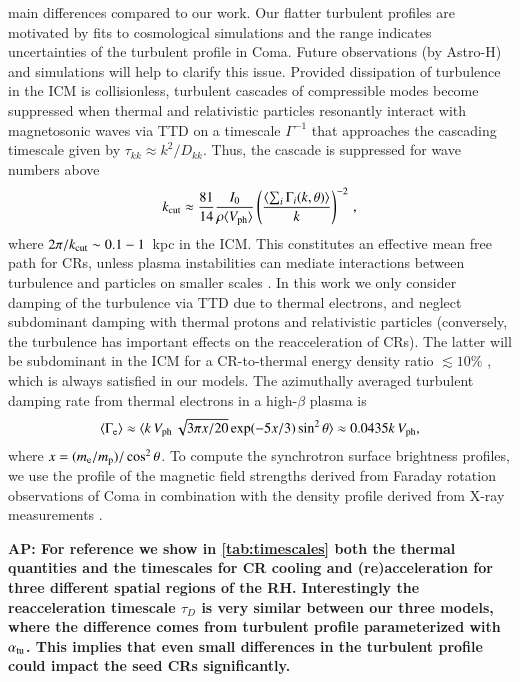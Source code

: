 \documentclass[useAMS,usenatbib]{mn2e}
\newcommand{\Vph}{V_\mathrm{ph}}
\def\AP#1{{\bf  AP: #1}}
\begin{document}
main differences compared to our work. Our flatter turbulent profiles
are motivated by fits to cosmological simulations
\citep{2009ApJ...705.1129L,2010ApJ...725.1452S,2011A&A...529A..17V,2012ApJ...758...74B}
and the range indicates uncertainties of the turbulent profile in
Coma. Future observations (by Astro-H) and simulations will help to
clarify this issue. Provided dissipation of turbulence in the ICM is
collisionless, turbulent cascades of compressible modes become
suppressed when thermal and relativistic particles resonantly interact
with magnetosonic waves via TTD on a timescale $\Gamma^{-1}$ that
approaches the cascading timescale given by $\tau_{kk} \approx
k^2/D_{kk}$. Thus, the cascade is suppressed for wave numbers above
\begin{equation}
\label{eq:kc}
  k_\rmn{cut} \approx \frac{81}{14} \frac{I_0}{\rho \langle \Vph \rangle}
  \left(\frac{\langle\sum_i \Gamma_i(k,\theta)\rangle}{k}\right)^{-2}\,,
\end{equation}
where $2\pi/k_{\mathrm{cut}}\sim 0.1-1$~kpc in the ICM. This constitutes an
effective mean free path for CRs, unless plasma instabilities can
mediate interactions between turbulence and particles on smaller
scales \citep{brunetti11}. In this work we only consider damping of
the turbulence via TTD due to thermal electrons, and neglect
subdominant damping with thermal protons and relativistic particles
(conversely, the turbulence has important effects on the
reacceleration of CRs). The latter will be subdominant in the ICM for
a CR-to-thermal energy density ratio $\lesssim 10 \%$
\citep{brunetti07}, which is always satisfied in our models. The
azimuthally averaged turbulent damping rate from thermal electrons
\citep{brunetti07} in a high-$\beta$ plasma is
\begin{equation}
\label{eq:Gamma_e}
\langle\Gamma_{\rmn{e}}\rangle \approx \langle k\,\Vph\,\sqrt{3\pi
  x/20}\exp(-5x/3)\sin^2{\theta}\rangle\approx 0.0435k\,\Vph, 
\end{equation}
where $x=(m_{{\mathrm{e}}}/m_{{\mathrm{p}}})/\cos^2{\theta}$. To compute the
synchrotron surface brightness profiles, we use the profile of the
magnetic field strengths derived from Faraday rotation observations of
Coma \citep{bonafede10} in combination with the density profile
derived from X-ray measurements \citep{1992A&A...259L..31B}.

\AP{For reference we show in \ref{tab:timescales} both the thermal
  quantities and the timescales for CR cooling and (re)acceleration
  for three different spatial regions of the RH. Interestingly the
  reacceleration timescale $\tau_D$ is very similar between our three
  models, where the difference comes from turbulent profile
  parameterized with $\alpha_{\mathrm{tu}}$. This implies that even small
  differences in the turbulent profile could impact the seed CRs
  significantly.}
\end{document}
